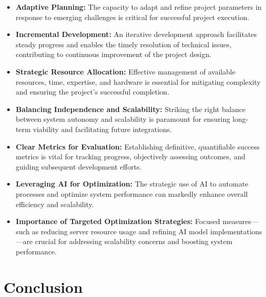 \begin{itemize}
    \item \textbf{Adaptive Planning:} The capacity to adapt and refine project parameters in response to emerging challenges is critical for successful project execution.
    \item \textbf{Incremental Development:} An iterative development approach facilitates steady progress and enables the timely resolution of technical issues, contributing to continuous improvement of the project design.
    \item \textbf{Strategic Resource Allocation:} Effective management of available resources, time, expertise, and hardware is essential for mitigating complexity and ensuring the project’s successful completion.
    \item \textbf{Balancing Independence and Scalability:} Striking the right balance between system autonomy and scalability is paramount for ensuring long-term viability and facilitating future integrations.
    \item \textbf{Clear Metrics for Evaluation:} Establishing definitive, quantifiable success metrics is vital for tracking progress, objectively assessing outcomes, and guiding subsequent development efforts.
    \item \textbf{Leveraging AI for Optimization:} The strategic use of AI to automate processes and optimize system performance can markedly enhance overall efficiency and scalability.
    \item \textbf{Importance of Targeted Optimization Strategies:} Focused measures—such as reducing server resource usage and refining AI model implementations—are crucial for addressing scalability concerns and boosting system performance.
\end{itemize}

\section{Conclusion}


